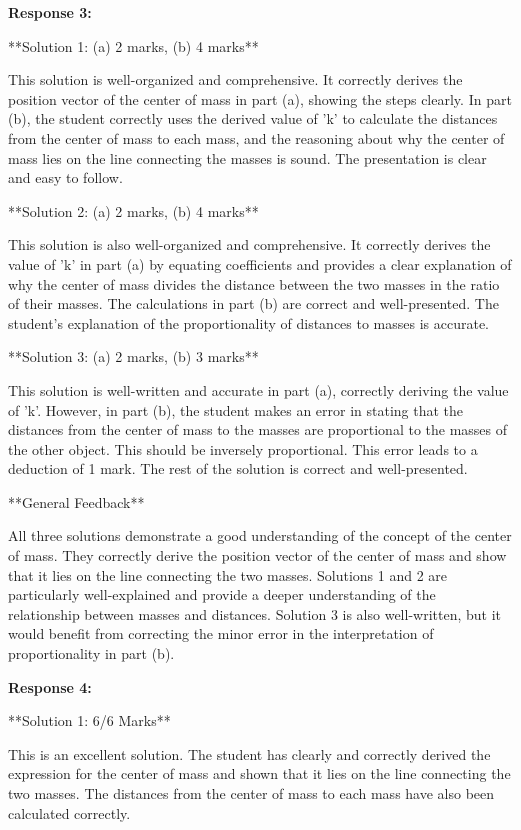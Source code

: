 \documentclass[a4paper,11pt]{article}
\begin{document}
\bigskip    
\textbf{Response 3:}

**Solution 1: (a) 2 marks, (b) 4 marks**

This solution is well-organized and comprehensive. It correctly derives the position vector of the center of mass in part (a), showing the steps clearly. In part (b), the student correctly uses the derived value of 'k' to calculate the distances from the center of mass to each mass, and the reasoning about why the center of mass lies on the line connecting the masses is sound. The presentation is clear and easy to follow.

**Solution 2: (a) 2 marks, (b) 4 marks**

This solution is also well-organized and comprehensive. It correctly derives the value of 'k' in part (a) by equating coefficients and provides a clear explanation of why the center of mass divides the distance between the two masses in the ratio of their masses. The calculations in part (b) are correct and well-presented. The student's explanation of the proportionality of distances to masses is accurate.

**Solution 3: (a) 2 marks, (b) 3 marks**

This solution is well-written and accurate in part (a), correctly deriving the value of 'k'. However, in part (b), the student makes an error in stating that the distances from the center of mass to the masses are proportional to the masses of the other object. This should be inversely proportional. This error leads to a deduction of 1 mark. The rest of the solution is correct and well-presented.

**General Feedback**

All three solutions demonstrate a good understanding of the concept of the center of mass. They correctly derive the position vector of the center of mass and show that it lies on the line connecting the two masses. Solutions 1 and 2 are particularly well-explained and provide a deeper understanding of the relationship between masses and distances. Solution 3 is also well-written, but it would benefit from correcting the minor error in the interpretation of proportionality in part (b).

\textbf{Response 4:}

**Solution 1: 6/6 Marks**

This is an excellent solution. The student has clearly and correctly derived the expression for the center of mass and shown that it lies on the line connecting the two masses. The distances from the center of mass to each mass have also been calculated correctly.
\end{document}

